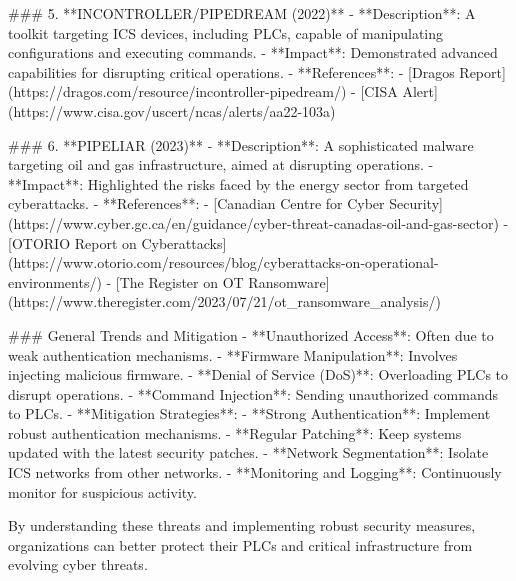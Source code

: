 ### 5. **INCONTROLLER/PIPEDREAM (2022)**
- **Description**: A toolkit targeting ICS devices, including PLCs, capable of manipulating configurations and executing commands.
- **Impact**: Demonstrated advanced capabilities for disrupting critical operations.
- **References**:
  - [Dragos Report](https://dragos.com/resource/incontroller-pipedream/)
  - [CISA Alert](https://www.cisa.gov/uscert/ncas/alerts/aa22-103a)

### 6. **PIPELIAR (2023)**
- **Description**: A sophisticated malware targeting oil and gas infrastructure, aimed at disrupting operations.
- **Impact**: Highlighted the risks faced by the energy sector from targeted cyberattacks.
- **References**:
  - [Canadian Centre for Cyber Security](https://www.cyber.gc.ca/en/guidance/cyber-threat-canadas-oil-and-gas-sector)
  - [OTORIO Report on Cyberattacks](https://www.otorio.com/resources/blog/cyberattacks-on-operational-environments/)
  - [The Register on OT Ransomware](https://www.theregister.com/2023/07/21/ot_ransomware_analysis/)

### General Trends and Mitigation
- **Unauthorized Access**: Often due to weak authentication mechanisms.
- **Firmware Manipulation**: Involves injecting malicious firmware.
- **Denial of Service (DoS)**: Overloading PLCs to disrupt operations.
- **Command Injection**: Sending unauthorized commands to PLCs.
- **Mitigation Strategies**:
  - **Strong Authentication**: Implement robust authentication mechanisms.
  - **Regular Patching**: Keep systems updated with the latest security patches.
  - **Network Segmentation**: Isolate ICS networks from other networks.
  - **Monitoring and Logging**: Continuously monitor for suspicious activity.

By understanding these threats and implementing robust security measures, organizations can better protect their PLCs and critical infrastructure from evolving cyber threats.
